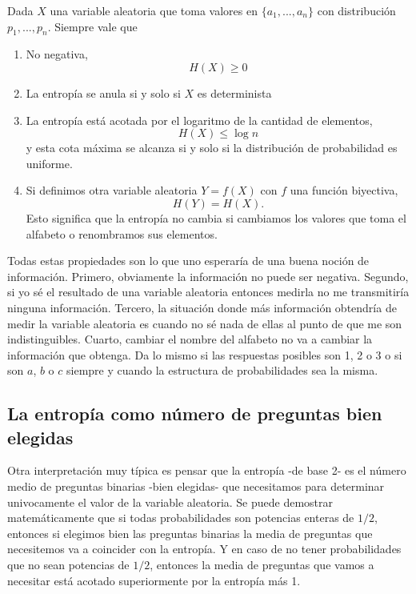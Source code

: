 \begin{theorem}
    Dada $X$  una variable aleatoria que toma valores en $\{a_1,...,a_n\}$ con distribuci\'on $p_1,...,p_n$. Siempre vale que
    \begin{enumerate}
        \item No negativa,
        \begin{equation}
            H(X)\geq 0
        \end{equation}
        \item La entrop\'ia se anula si y solo si $X$ es determinista
        \item La entrop\'ia est\'a acotada por el logaritmo de la cantidad de elementos,
        \begin{equation}
            H(X)\leq \log n
        \end{equation}
        y esta cota m\'axima se alcanza si y solo si la distribuci\'on de probabilidad es uniforme.
        \item Si definimos otra variable aleatoria $Y=f(X)$ con $f$ una funci\'on biyectiva,
        \begin{equation}
            H(Y) = H(X).
        \end{equation}
        Esto significa que la entrop\'ia no cambia si cambiamos los valores que toma el alfabeto o renombramos sus elementos.
    \end{enumerate}
\end{theorem}
Todas estas propiedades son lo que uno esperar\'ia de una buena noci\'on de informaci\'on. Primero, obviamente la informaci\'on no puede ser negativa. Segundo, si yo s\'e el resultado de una variable aleatoria entonces medirla no me transmitir\'ia ninguna informaci\'on. Tercero, la situaci\'on donde m\'as informaci\'on obtendr\'ia de medir la variable aleatoria es cuando no s\'e nada de ellas al punto de que me son indistinguibles. Cuarto, cambiar el nombre del alfabeto no va a cambiar la informaci\'on que obtenga. Da lo mismo si las respuestas posibles son 1, 2 o 3 o si son $a$, $b$ o $c$ siempre y cuando la estructura de probabilidades sea la misma.

\subsection{La entrop\'ia como n\'umero de preguntas bien elegidas}
Otra interpretaci\'on muy t\'ipica es pensar que la entrop\'ia -de base 2- es el n\'umero medio de preguntas binarias -bien elegidas-  que necesitamos para determinar univocamente el valor de la variable aleatoria. Se puede demostrar matem\'aticamente que si todas probabilidades son potencias enteras de $1/2$, entonces si elegimos bien las preguntas binarias la media de preguntas que necesitemos va a coincider con la entrop\'ia. Y en caso de no tener probabilidades que no sean potencias de $1/2$, entonces la media de preguntas que vamos a necesitar est\'a acotado superiormente por la entrop\'ia m\'as 1.

